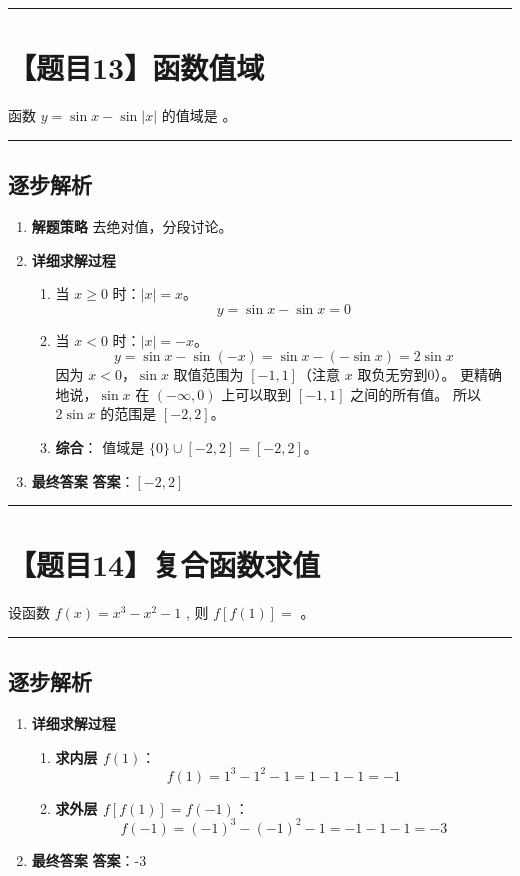 \documentclass[UTF8]{ctexart}
\newenvironment{redenv}{\color{red}}{}
\newenvironment{detailedanalysis}{%
    \color{red}
    \begin{enumerate}[label=\textbf{第\arabic*步：}, leftmargin=*, align=left, itemsep=1.5ex]
}{%
    \end{enumerate}
}
\newcommand{\problemrule}{\noindent\rule{\textwidth}{1.5pt}\vspace{-0.8em}}
\newcommand{\analysisrule}{\noindent\rule{\textwidth}{0.8pt}\vspace{-0.8em}}
\newcommand{\blank}[1]{\underline{\hspace{#1}}}
\begin{document}
\problemrule
\section*{【题目13】函数值域}
函数 $ y = \sin x - \sin |x| $ 的值域是 \blank{2cm}。

\begin{redenv}
\analysisrule
\subsection*{逐步解析}

\begin{detailedanalysis}
\item \textbf{解题策略}
去绝对值，分段讨论。

\item \textbf{详细求解过程}
\begin{enumerate}[label=(\arabic*)]
\item 当 $x \ge 0$ 时：$|x| = x$。
$$ y = \sin x - \sin x = 0 $$
\item 当 $x < 0$ 时：$|x| = -x$。
$$ y = \sin x - \sin(-x) = \sin x - (-\sin x) = 2\sin x $$
因为 $x < 0$，$\sin x$ 取值范围为 $[-1, 1]$（注意 $x$ 取负无穷到0）。
更精确地说，$\sin x$ 在 $(-\infty, 0)$ 上可以取到 $[-1, 1]$ 之间的所有值。
所以 $2\sin x$ 的范围是 $[-2, 2]$。
\item \textbf{综合}：
值域是 $\{0\} \cup [-2, 2] = [-2, 2]$。
\end{enumerate}

\item \textbf{最终答案}
\textbf{答案}：$ [-2, 2] $
\end{detailedanalysis}
\end{redenv}

\problemrule
\section*{【题目14】复合函数求值}
设函数 $ f(x)=x^{3}-x^{2}-1 $ , 则 $ f[f(1)]= $ \blank{2cm}。

\begin{redenv}
\analysisrule
\subsection*{逐步解析}

\begin{detailedanalysis}
\item \textbf{详细求解过程}
\begin{enumerate}[label=(\arabic*)]
\item \textbf{求内层 $f(1)$}：
$$ f(1) = 1^3 - 1^2 - 1 = 1 - 1 - 1 = -1 $$
\item \textbf{求外层 $f[f(1)] = f(-1)$}：
$$ f(-1) = (-1)^3 - (-1)^2 - 1 = -1 - 1 - 1 = -3 $$
\end{enumerate}

\item \textbf{最终答案}
\textbf{答案}：-3
\end{detailedanalysis}
\end{redenv}
\end{document}
